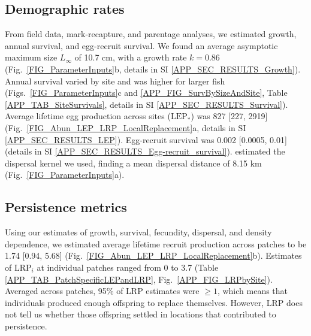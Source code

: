 \documentclass[12pt, oneside]{article}   	%
\begin{document}
\subsection*{Demographic rates}

From field data, mark-recapture, and parentage analyses, we estimated growth, annual survival, and egg-recruit survival. We found an average asymptotic maximum size $L_\infty$ of 10.7 cm, with a growth rate $k = 0.86$ (Fig.\ \ref{FIG_ParameterInputs}b, details in SI \ref{APP_SEC_RESULTS_Growth}). Annual survival varied by site and was higher for larger fish (Figs.\ \ref{FIG_ParameterInputs}c and \ref{APP_FIG_SurvBySizeAndSite}, Table \ref{APP_TAB_SiteSurvivals}, details in SI \ref{APP_SEC_RESULTS_Survival}). Average lifetime egg production across sites ($\text{LEP}_*$) was 827 [227, 2919] (Fig.\ \ref{FIG_Abun_LEP_LRP_LocalReplacement}a, details in SI \ref{APP_SEC_RESULTS_LEP}). Egg-recruit survival was 0.002 [0.0005, 0.01] (details in SI \ref{APP_SEC_RESULTS_Egg-recruit_survival}). \cite{catalanoInPrepconnectivity} estimated the dispersal kernel we used, finding a mean dispersal distance of 8.15 km (Fig.\ \ref{FIG_ParameterInputs}a).

\subsection*{Persistence metrics}

Using our estimates of growth, survival, fecundity, dispersal, and density dependence, we estimated average lifetime recruit production across patches to be 1.74 [0.94, 5.68] (Fig.\ \ref{FIG_Abun_LEP_LRP_LocalReplacement}b). Estimates of $\text{LRP}_i$ at individual patches ranged from 0 to 3.7 (Table \ref{APP_TAB_PatchSpecificLEPandLRP}, Fig.\ \ref{APP_FIG_LRPbySite}). Averaged across patches, 95\% of LRP estimates were $\geq 1$, which means that individuals produced enough offspring to replace themselves. However, LRP does not tell us whether those offspring settled in locations that contributed to persistence.

\end{document}
